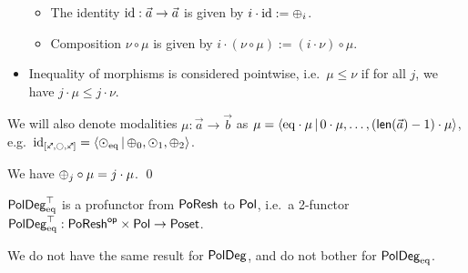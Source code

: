 \documentclass[a4paper]{memoir}
\begin{document}
\begin{definition}
\begin{itemize}
\begin{itemize}
			\item The identity $\mathrm{id} : \vec a \to \vec a$ is given by $i \cdot \mathrm{id} := {{\oplus}}_{i}$.
			\item Composition $\nu \circ \mu$ is given by $i \cdot (\nu \circ \mu) := (i \cdot \nu) \circ \mu$.
		\end{itemize}
		\item Inequality of morphisms is considered pointwise, i.e.\ $\mu \leq \nu$ if for all $j$, we have $j \cdot \mu \leq j \cdot \nu$.
	\end{itemize}
	We will also denote modalities $\mu : \vec a \to \vec b$ as $\mu = \mathopen{}\left\langle {\mathrm{eq}} \cdot \mu \,\middle|\, 0 \cdot \mu, \ldots, (\mathsf{len}(\vec a) - 1) \cdot \mu \right\rangle\mathclose{}$, e.g.\ $\id_{[\ypolar, \npolar, \ypolar]} = \reshlist{\pdeg \nonpol \eqtydeg}{\pdeg \pospol 0, \pdeg \nonpol 1, \pdeg \pospol 2}$.
\end{definition}
\begin{corollary} \label{thm:deg-vs-poldeg-poresh}
	We have ${\oplus}_j \circ \mu = j \cdot \mu$. \qed
\end{corollary}
\begin{proposition}
	$\mathsf{PolDeg}_{\mathrm{eq}}^\top$ is a profunctor from $\mathsf{PoResh}$ to ${\mathsf{Pol}}$, i.e.\ a 2-functor $\mathsf{PolDeg}_{\mathrm{eq}}^\top : \mathsf{PoResh}^{\mathsf{op}} \times {\mathsf{Pol}} \to {\mathsf{Poset}}$.
\end{proposition}
We do not have the same result for $\mathsf{PolDeg}$, and do not bother for $\mathsf{PolDeg}_{\mathrm{eq}}$.
\end{document}
